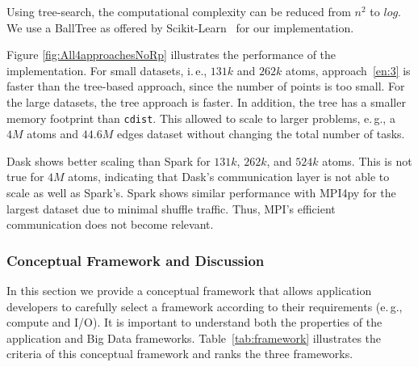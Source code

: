Using tree-search, the computational complexity can be reduced from $n^2$ to $log$. 
We use a BallTree as offered by Scikit-Learn~\cite{scikit-nearest} for our implementation.

Figure \ref{fig:All4approachesNoRp} illustrates the performance of the implementation.
For small datasets, i.\,e., $131k$ and $262k$ atoms, approach~\ref{en:3} is faster than the tree-based approach, since the number of points is too small.
For the large datasets, the tree approach is faster.
In addition, the tree has a smaller memory footprint than \texttt{cdist}.
This allowed to scale to larger problems, e.\,g., a $4M$ atoms and $44.6M$ edges dataset without changing the total number of tasks.

Dask shows better scaling than Spark for $131k$, $262k$, and $524k$ atoms.
This is not true for $4M$ atoms, indicating that Dask's communication layer is not able to scale as well as Spark's.
Spark shows similar performance with MPI4py for the largest dataset due to minimal shuffle traffic.
Thus, MPI's efficient communication does not become relevant.

\subsubsection{Conceptual Framework and Discussion}
In this section we provide a conceptual framework that allows application developers to carefully select a framework according to their requirements (e.\,g., compute and I/O).
It is important to understand both the properties of the application and Big Data frameworks.
Table~\ref{tab:framework} illustrates the criteria of this conceptual framework and ranks the three frameworks.

